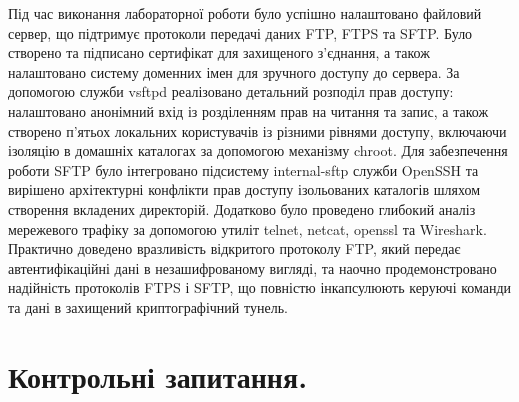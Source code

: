 \documentclass[14pt, a4paper]{extreport}
\begin{document}
	Під час виконання лабораторної роботи було успішно налаштовано файловий сервер, що підтримує протоколи передачі даних FTP, FTPS та SFTP. Було створено та підписано сертифікат для захищеного з'єднання, а також налаштовано систему доменних імен для зручного доступу до сервера. За допомогою служби vsftpd реалізовано детальний розподіл прав доступу: налаштовано анонімний вхід із розділенням прав на читання та запис, а також створено п'ятьох локальних користувачів із різними рівнями доступу, включаючи ізоляцію в домашніх каталогах за допомогою механізму chroot. Для забезпечення роботи SFTP було інтегровано підсистему internal-sftp служби OpenSSH та вирішено архітектурні конфлікти прав доступу ізольованих каталогів шляхом створення вкладених директорій. Додатково було проведено глибокий аналіз мережевого трафіку за допомогою утиліт telnet, netcat, openssl та Wireshark. Практично доведено вразливість відкритого протоколу FTP, який передає автентифікаційні дані в незашифрованому вигляді, та наочно продемонстровано надійність протоколів FTPS і SFTP, що повністю інкапсулюють керуючі команди та дані в захищений криптографічний тунель.
	
	\section*{Контрольні запитання.}
	
\end{document}
